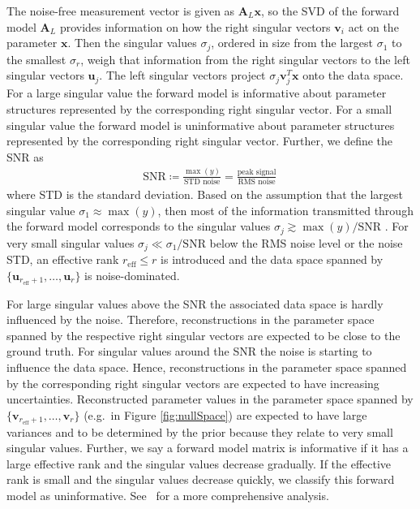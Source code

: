 The noise-free measurement vector is given as $\bm{A}_L\bm{x}$, so the SVD of the forward model $\bm{A}_L$ provides information on how the right singular vectors $\bm{v}_i$ act on the parameter $\bm{x}$.
Then the singular values $\sigma_j $, ordered in size from the largest $\sigma_1$ to the smallest $\sigma_{r}$, weigh that information from the right singular vectors to the left singular vectors $\bm{u}_j$.
The left singular vectors project $\sigma_j \bm{v}^T_j \bm{x} $ onto the data space.
For a large singular value the forward model is informative about parameter structures represented by the corresponding right singular vector. 
For a small singular value the forward model is uninformative about parameter structures represented by the corresponding right singular vector.
Further, we define the SNR as
\begin{align}
	\text{SNR} \coloneqq \frac{\max(y)}{\text{STD noise}} = \frac{\text{peak signal}}{\text{RMS noise}} \label{eq:SNR} \, 
\end{align}
where STD is the standard deviation.
Based on the assumption that the largest singular value $\sigma_1  \approx \max(y)$, then most of the information transmitted through the forward model corresponds to the singular values $\sigma_j \gtrsim \max(y)/ \text{SNR}$ \cite{fox2025BlokkLecNot}.
For very small singular values $\sigma_j \ll \sigma_1/\text{SNR}$ below the RMS noise level or the noise STD, an effective rank $r_{\text{eff}} \leq r$ is introduced and the data space spanned by $ \{\bm{u}_{r_{\text{eff}} +1}, \dots ,\bm{u}_r \}$ is noise-dominated.

For large singular values above the SNR the associated data space is hardly influenced by the noise.
Therefore, reconstructions in the parameter space spanned by the respective right singular vectors are expected to be close to the ground truth.
For singular values around the SNR the noise is starting to influence the data space.
Hence, reconstructions in the parameter space spanned by the corresponding right singular vectors are expected to have increasing uncertainties.
Reconstructed parameter values in the parameter space spanned by $ \{\bm{v}_{r_{\text{eff}} +1}, \dots ,\bm{v}_r \}$ (e.g.~in Figure \ref{fig:nullSpace}) are expected to have large variances and to be determined by the prior because they relate to very small singular values.
Further, we say a forward model matrix is informative if it has a large effective rank and the singular values decrease gradually.
If the effective rank is small and the singular values decrease quickly, we classify this forward model as uninformative.
See~\cite{tan2016LecNot} for a more comprehensive analysis.


